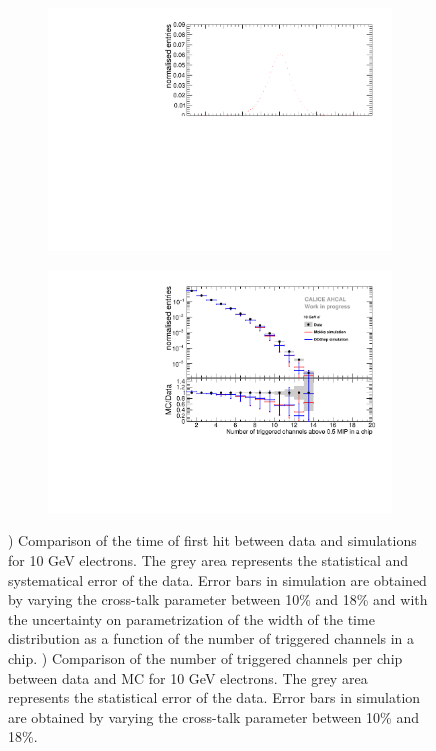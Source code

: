 \begin{figure}[htbp!]
	\centering
	\begin{subfigure}[t]{0.49\textwidth}
		\includegraphics[width=1\textwidth]{../Thesis_Plots/Timing/Electrons/Plots/Comparison_SimData_Electrons10GeV.pdf}
		\caption{}\label{fig:elec_sim_data_10GeV}
	\end{subfigure}
	\hfill
	\begin{subfigure}[t]{0.49\textwidth}
		\includegraphics[width=1\textwidth]{../Thesis_Plots/Timing/Electrons/Plots/Comparison_SimData_Electrons_nHits_10GeV.pdf}
		\caption{}\label{fig:elec_sim_data_nHits_10GeV}
	\end{subfigure}
	\caption{) Comparison of the time of first hit between data and simulations for 10 GeV electrons. The grey area represents the statistical and systematical error of the data. Error bars in simulation are obtained by varying the cross-talk parameter between 10\% and 18\% and with the uncertainty on parametrization of the width of the time distribution as a function of the number of triggered channels in a chip. ) Comparison of the number of triggered channels per chip between data and MC for 10 GeV electrons. The grey area represents the statistical error of the data. Error bars in simulation are obtained by varying the cross-talk parameter between 10\% and 18\%.}
\end{figure}

